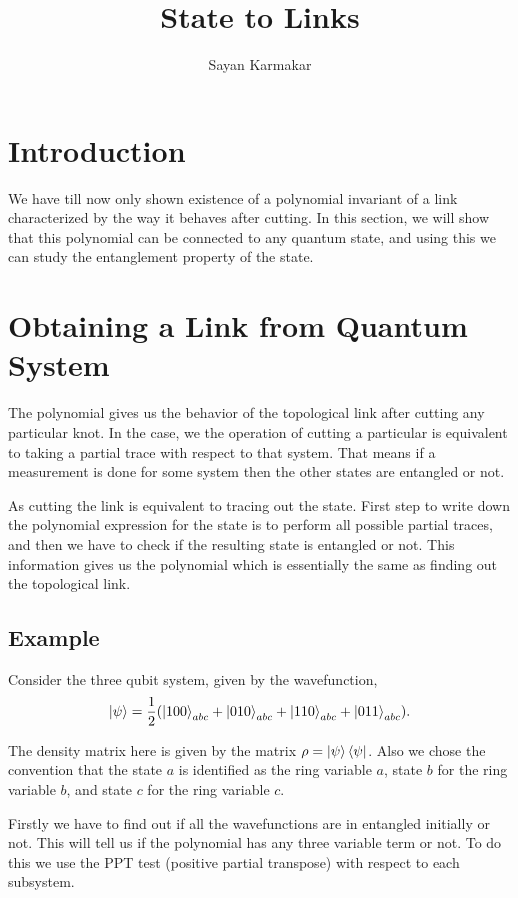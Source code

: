 \documentclass{amsart}
\theoremstyle{plain}
\theoremstyle{definition}
\theoremstyle{plain}
\begin{document}
	\title{State to Links}
	\author{Sayan Karmakar }
	\address{Department of Physics, IISERK}
	\maketitle
	
	
	\section{Introduction}
	We have till now only shown existence of a polynomial invariant of a link characterized by the way it behaves after cutting. In this section, we will show that this polynomial can be connected to any quantum state, and using this we can study the entanglement property of the state.
	 
	 
	\section{Obtaining a Link from Quantum System} 
	The polynomial gives us the behavior of the topological link after cutting any particular knot. In the case, we the operation of cutting a particular is equivalent to taking a partial trace with respect to that system. That means if a measurement is done for some system then the other states are entangled or not. 
	
	As cutting the link is equivalent to tracing out the state. First step to write down the polynomial expression for the state is to perform all possible partial traces, and then we have to check if the resulting state is entangled or not. This information gives us the polynomial which is essentially the same as finding out the topological link.
	
	\subsection{Example}
	
	Consider the three qubit system, given by the wavefunction, 
	 \begin{equation*}
	 	\ket{\psi} = \frac{1}{2} (\ket{100}_{abc} + \ket{010}_{abc} + \ket{110}_{abc}+ \ket{011}_{abc}).
	 \end{equation*}
 
 	The density matrix here is given by the matrix $\rho = \ket{\psi}\bra{\psi}$. Also we chose the convention that the state $a$ is identified as the ring variable $a$,  state $b$ for the ring variable $b$, and state $c$ for the ring variable $c$.
 	
 	Firstly we have to find out if all the wavefunctions are in entangled initially or not. This will tell us if the polynomial has any three variable term or not. To do this we use the PPT test (positive partial transpose) with respect to each subsystem.
	
	
\end{document}
